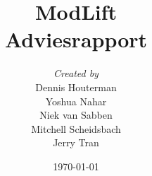 \documentclass[11pt]{report}
\begin{document}
\title{\Huge{ModLift} \\ \large{Adviesrapport}}
\author{
\textit{Created by}\\
Dennis Houterman\\
Yoshua Nahar\\
Niek van Sabben\\
Mitchell Scheidsbach\\
Jerry Tran
}
\date{\today}
\maketitle{}
\tableofcontents{}






\end{document}
